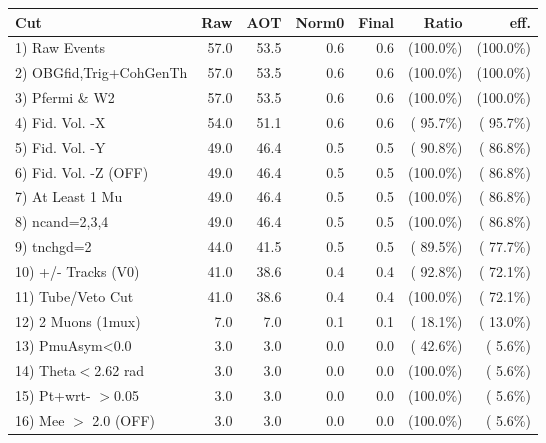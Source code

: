  \begin{table}[h!]\centering
 \begin{tabular}{||l||r|r|r|r|r|r||}
 \hline
 \hline
 Cut & Raw & AOT & Norm0 & Final & Ratio & eff.       \\
 \hline
  1) Raw Events           &         57.0 &         53.5 &          0.6 &          0.6 & (100.0\%) & (100.0\%) \\
  2) OBGfid,Trig+CohGenTh &         57.0 &         53.5 &          0.6 &          0.6 & (100.0\%) & (100.0\%) \\
  3) Pfermi \& W2         &         57.0 &         53.5 &          0.6 &          0.6 & (100.0\%) & (100.0\%) \\
  4) Fid. Vol. -X         &         54.0 &         51.1 &          0.6 &          0.6 & ( 95.7\%) & ( 95.7\%) \\
  5) Fid. Vol. -Y         &         49.0 &         46.4 &          0.5 &          0.5 & ( 90.8\%) & ( 86.8\%) \\
  6) Fid. Vol. -Z (OFF)   &         49.0 &         46.4 &          0.5 &          0.5 & (100.0\%) & ( 86.8\%) \\
  7) At Least 1 Mu        &         49.0 &         46.4 &          0.5 &          0.5 & (100.0\%) & ( 86.8\%) \\
  8) ncand=2,3,4          &         49.0 &         46.4 &          0.5 &          0.5 & (100.0\%) & ( 86.8\%) \\
  9) tnchgd=2             &         44.0 &         41.5 &          0.5 &          0.5 & ( 89.5\%) & ( 77.7\%) \\
 10) +/- Tracks (V0)      &         41.0 &         38.6 &          0.4 &          0.4 & ( 92.8\%) & ( 72.1\%) \\
 11) Tube/Veto Cut        &         41.0 &         38.6 &          0.4 &          0.4 & (100.0\%) & ( 72.1\%) \\
 12) 2 Muons (1mux)       &          7.0 &          7.0 &          0.1 &          0.1 & ( 18.1\%) & ( 13.0\%) \\
 13) PmuAsym<0.0          &          3.0 &          3.0 &          0.0 &          0.0 & ( 42.6\%) & (  5.6\%) \\
 14) Theta$<$2.62 rad     &          3.0 &          3.0 &          0.0 &          0.0 & (100.0\%) & (  5.6\%) \\
 15) Pt+wrt- $>$0.05      &          3.0 &          3.0 &          0.0 &          0.0 & (100.0\%) & (  5.6\%) \\
 16) Mee $>$ 2.0  (OFF)   &          3.0 &          3.0 &          0.0 &          0.0 & (100.0\%) & (  5.6\%) \\

\end{tabular}
\end{table}
